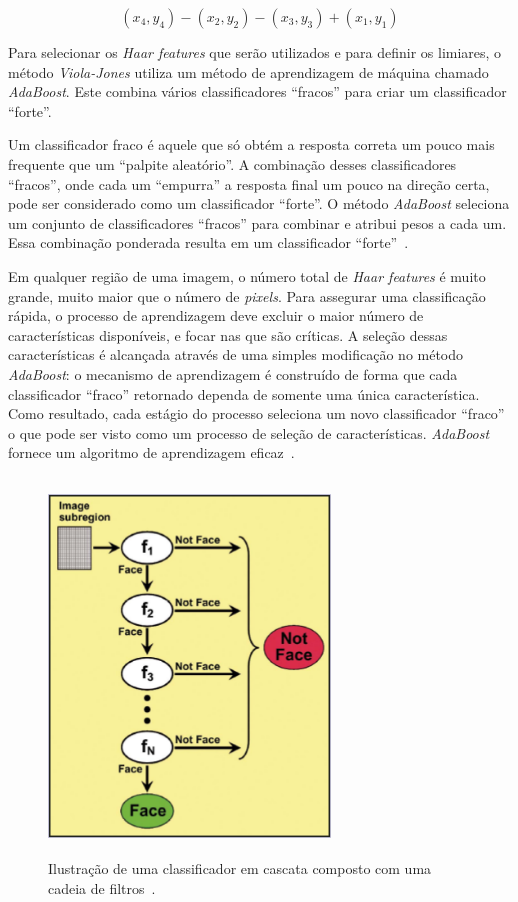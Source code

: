 	\begin{equation}
		(x_4,y_4) - (x_2,y_2) - (x_3,y_3) + (x_1,y_1)
		\label{equacaointegralimage}
	\end{equation} 

Para selecionar os \textit{Haar features} que serão utilizados e para definir os limiares, o método \textit{Viola-Jones} utiliza um método de aprendizagem de máquina chamado \textit{AdaBoost}. Este combina vários classificadores ``fracos'' para criar um classificador ``forte''. 

Um classificador fraco é aquele que só obtém a resposta correta um pouco mais frequente que um ``palpite aleatório''. A combinação desses classificadores ``fracos'', onde cada um ``empurra'' a resposta final um pouco na direção certa, pode ser considerado como um classificador ``forte''. O método \textit{AdaBoost} seleciona um conjunto de classificadores ``fracos'' para combinar e atribui pesos a cada um. Essa combinação ponderada resulta em um classificador ``forte''~\cite{servodetection}.

Em qualquer região de uma imagem, o número total de \textit{Haar features} é muito grande, muito maior que o número de \textit{pixels}. Para assegurar uma classificação rápida, o processo de aprendizagem deve excluir o maior número de características disponíveis, e focar nas que são críticas. A seleção dessas características é alcançada através de uma simples modificação no método \textit{AdaBoost}: o mecanismo de aprendizagem é construído de forma que cada classificador ``fraco'' retornado dependa de somente uma única característica. Como resultado, cada estágio do processo seleciona um novo classificador ``fraco'' o que pode ser visto como um processo de seleção de características. \textit{AdaBoost} fornece um algoritmo de aprendizagem eficaz~\cite{violajones}.

	\begin{figure}[htb]
		\begin{center}
			\includegraphics[height=10cm,width=7.5cm]{figuras/2.FundamentacaoTeorica/filterchain.png}
		\end{center}
		\caption{Ilustração de uma classificador em cascata composto com uma cadeia de filtros~\cite{servodetection}.}
		\label{filterchain}
	\end{figure}

